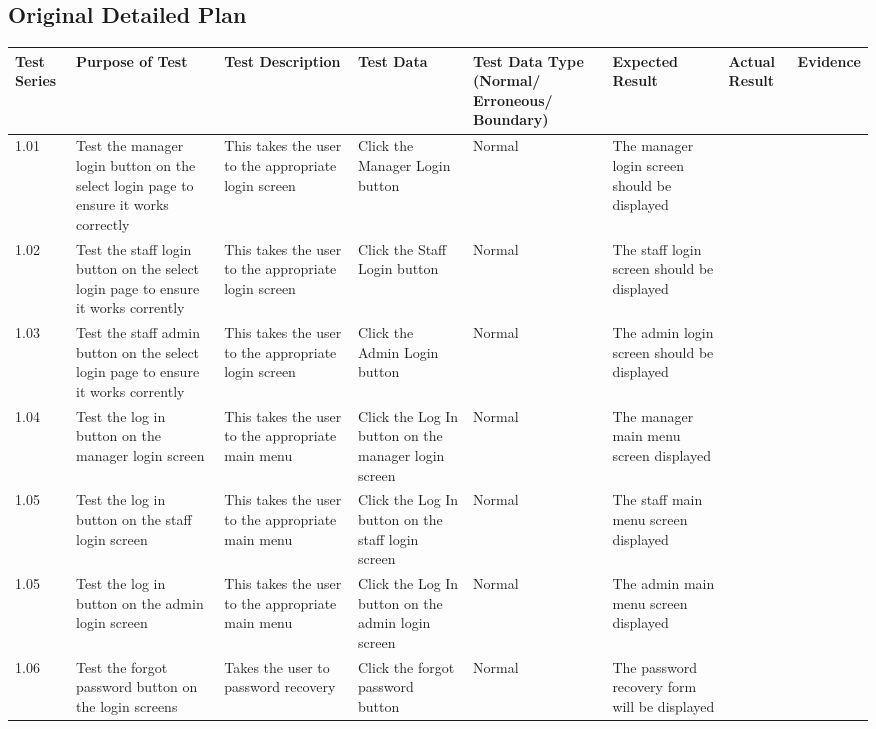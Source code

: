 \begin{landscape}
\begin{center}
\begin{tabular}{|p{2cm}|p{5cm}|p{5cm}|p{4cm}|}
    \end{tabular}
\end{center}

\subsection{Original Detailed Plan}

\begin{center}
    \begin{longtable}{|p{1.5cm}|p{2cm}|p{2.5cm}|p{4cm}|p{2cm}|p{2cm}|p{1cm}|p{1.7cm}|}
        \hline
        \textbf{Test Series} & \textbf{Purpose of Test} & \textbf{Test Description} & \textbf{Test Data} & \textbf{Test Data Type (Normal/ Erroneous/ Boundary)} & \textbf{Expected Result} & \textbf{Actual Result} & \textbf{Evidence}\\ \hline
1.01 & Test the manager login button on the select login page to ensure it works correctly  & This takes the user to the appropriate login screen & Click the Manager Login button & Normal & The manager login screen should be displayed && \\ \hline
1.02 & Test the staff login button on the select login page to ensure it works corrently & This takes the user to the appropriate login screen & Click the Staff Login button & Normal & The staff login screen should be displayed && \\ \hline
1.03 & Test the staff admin button on the select login page to ensure it works corrently & This takes the user to the appropriate login screen & Click the Admin Login button & Normal & The admin login screen should be displayed && \\ \hline
1.04 & Test the log in button on the manager login screen  & This takes the user to the appropriate main menu & Click the Log In button on the manager login screen & Normal & The manager main menu screen displayed && \\ \hline
1.05 & Test the log in button on the staff login screen  & This takes the user to the appropriate main menu & Click the Log In button on the staff login screen & Normal & The staff main menu screen displayed && \\ \hline
1.05 & Test the log in button on the admin login screen  & This takes the user to the appropriate main menu & Click the Log In button on the admin login screen & Normal & The admin main menu screen displayed && \\ \hline
1.06 & Test the forgot password button on the login screens & Takes the user to password recovery & Click the forgot password button & Normal & The password recovery form will be displayed && \\ \hline

\end{longtable}
\end{center}
\end{landscape}
